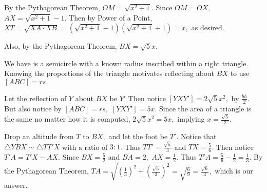 \begin{enumerate}
\begin{solu}
\begin{addsol}
{    By the Pythagorean Theorem, $OM=\sqrt{x^2+1}.$ Since $OM=OX,$ $AX=\sqrt{x^2+1}-1.$ Then by Power of a Point, $XT=\sqrt{XA\cdot XB}=(\sqrt{x^2+1}-1)(\sqrt{x^2+1}+1)=x,$ as desired.
    

Also, by the Pythagorean Theorem, $BX=\sqrt{5}x.$

We have is a semicircle with a known radius inscribed within a right triangle. Knowing the proportions of the triangle motivates reflecting about $BX$ to use $[ABC]=rs.$

Let the reflection of $Y$ about $BX$ be $Y'$ Then notice $[YXY']=2\sqrt{5}x^2,$ by $\frac{bh}{2}.$ But also notice by $[ABC]=rs,$ $[YXY']=5x.$ Since the area of a triangle is the same no matter how it is computed, $2\sqrt{5}x^2=5x,$ implying $x=\frac{\sqrt{5}}{2}.$


Drop an altitude from $T$ to $BX,$ and let the foot be $T'.$ Notice that $\triangle YBX\sim \triangle TT'X$ with a ratio of $3:1.$ Thus $TT'=\frac{\sqrt{5}}{3}$ and $TX=\frac{5}{6}.$ Then notice $T'A=T'X-AX.$ Since $BX=\frac{5}{2}$ and $BA=2,$ $AX=\frac{1}{2}.$ Thus $T'A=\frac{5}{6}-\frac{1}{2}=\frac{1}{3}.$ By the Pythagorean Theorem, $TA=\sqrt{(\frac{1}{3})^2+(\frac{\sqrt{5}}{3})^2}=\sqrt{\frac{6}{9}}=\frac{\sqrt{6}}{3},$ which is our answer.

}
    \end{addsol}
    \end{solu}
    

\end{enumerate}

